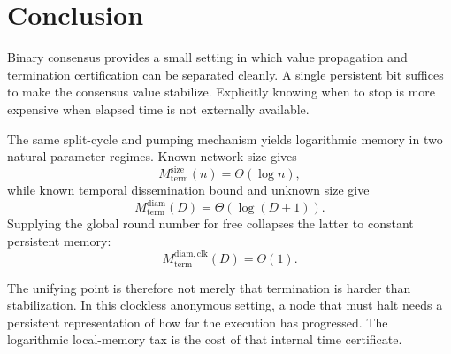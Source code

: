 \documentclass[11pt]{article}
\theoremstyle{remark}
\begin{document}
\section{Conclusion}
Binary consensus provides a small setting in which value propagation and termination certification can be separated cleanly. A single persistent bit suffices to make the consensus value stabilize. Explicitly knowing when to stop is more expensive when elapsed time is not externally available.

The same split-cycle and pumping mechanism yields logarithmic memory in two natural parameter regimes. Known network size gives
\[
M_{\mathrm{term}}^{\mathrm{size}}(n)=\Theta(\log n),
\]
while known temporal dissemination bound and unknown size give
\[
M_{\mathrm{term}}^{\mathrm{diam}}(D)=\Theta(\log(D+1)).
\]
Supplying the global round number for free collapses the latter to constant persistent memory:
\[
M_{\mathrm{term}}^{\mathrm{diam,clk}}(D)=\Theta(1).
\]

The unifying point is therefore not merely that termination is harder than stabilization. In this clockless anonymous setting, a node that must halt needs a persistent representation of how far the execution has progressed. The logarithmic local-memory tax is the cost of that internal time certificate.
\end{document}
